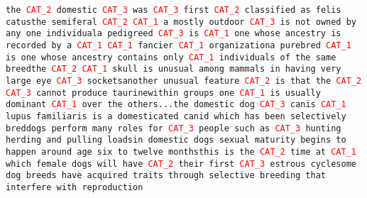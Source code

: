\texttt{the \textcolor{red}{CAT\_2} domestic \textcolor{red}{CAT\_3} was \textcolor{red}{CAT\_3} first \textcolor{red}{CAT\_2} classified as felis catus\newline the semiferal \textcolor{red}{CAT\_2} \textcolor{red}{CAT\_1} a mostly outdoor \textcolor{red}{CAT\_3} is not owned by any one individual\newline a pedigreed \textcolor{red}{CAT\_3} is \textcolor{red}{CAT\_1} one whose ancestry is recorded by a \textcolor{red}{CAT\_1} \textcolor{red}{CAT\_1} fancier \textcolor{red}{CAT\_1} organization\newline a purebred \textcolor{red}{CAT\_1} is one whose ancestry contains only \textcolor{red}{CAT\_1} individuals of the same breed\newline the \textcolor{red}{CAT\_2} \textcolor{red}{CAT\_1} skull is unusual among mammals in having very large eye \textcolor{red}{CAT\_3} sockets\newline another unusual feature \textcolor{red}{CAT\_2} is that the \textcolor{red}{CAT\_2} \textcolor{red}{CAT\_3} cannot produce taurine\newline within groups one \textcolor{red}{CAT\_1} is usually dominant \textcolor{red}{CAT\_1} over the others\newline ...\newline the domestic dog \textcolor{red}{CAT\_3} canis \textcolor{red}{CAT\_1} lupus familiaris is a domesticated canid which has been selectively bred\newline dogs perform many roles for \textcolor{red}{CAT\_3} people such as \textcolor{red}{CAT\_3} hunting herding and pulling loads\newline in domestic dogs sexual maturity begins to happen around age six to twelve months\newline this is the \textcolor{red}{CAT\_2} time at \textcolor{red}{CAT\_1} which female dogs will have \textcolor{red}{CAT\_2} their first \textcolor{red}{CAT\_3} estrous cycle\newline some dog breeds have acquired traits through selective breeding that interfere with reproduction}